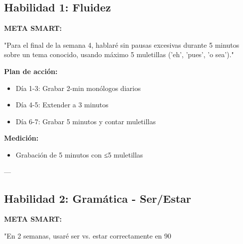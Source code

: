 \documentclass[a4paper,11pt]{article}
\begin{document}
\vspace{0.2cm}

\subsection{Habilidad 1: Fluidez}

\vspace{0.2cm}

\textbf{META SMART:}

"Para el final de la semana 4, hablaré sin pausas excesivas durante 5 minutos sobre un tema conocido, usando máximo 5 muletillas ('eh', 'pues', 'o sea')."

\vspace{0.2cm}

\textbf{Plan de acción:}

\begin{itemize}

  \item Día 1-3: Grabar 2-min monólogos diarios

  \item Día 4-5: Extender a 3 minutos

  \item Día 6-7: Grabar 5 minutos y contar muletillas

\end{itemize}

\vspace{0.2cm}

\textbf{Medición:}

\begin{itemize}

  \item [ ] Grabación de 5 minutos con ≤5 muletillas

\end{itemize}

\vspace{0.2cm}

---

\vspace{0.2cm}

\subsection{Habilidad 2: Gramática - Ser/Estar}

\vspace{0.2cm}

\textbf{META SMART:}

"En 2 semanas, usaré ser vs. estar correctamente en 90%
\end{document}
